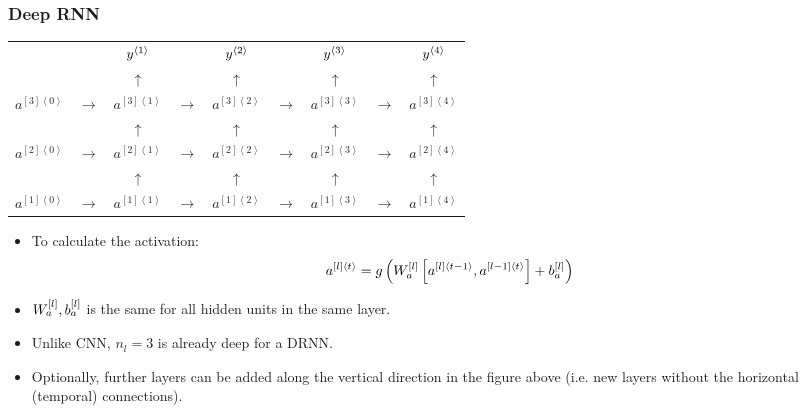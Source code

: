 \subsubsection{Deep RNN}
\newcommand{\drnnunit}[3]{#1^{\left[#2\right]\left\langle #3\right\rangle}}
\begin{center}
  \begin{tabular}{ccccccccc}
    && $y^{\left\langle 1\right\rangle}$ & & $y^{\left\langle 2\right\rangle}$ & & $y^{\left\langle 3\right\rangle}$ & & $y^{\left\langle 4\right\rangle}$\\
    && $\uparrow$ & &  $\uparrow$ & &  $\uparrow$ & &  $\uparrow$\\
    $\drnnunit{a}{3}{0}$ & $\rightarrow$ & $\boxed{\drnnunit{a}{3}{1}}$ & $\rightarrow$ & $\boxed{\drnnunit{a}{3}{2}}$ & $\rightarrow$ & $\boxed{\drnnunit{a}{3}{3}}$ & $\rightarrow$ & $\boxed{\drnnunit{a}{3}{4}}$ \\
    && $\uparrow$ & &  $\uparrow$ & &  $\uparrow$ & &  $\uparrow$\\
    $\drnnunit{a}{2}{0}$ & $\rightarrow$ & $\boxed{\drnnunit{a}{2}{1}}$ & $\rightarrow$ & $\boxed{\drnnunit{a}{2}{2}}$ & $\rightarrow$ & $\boxed{\drnnunit{a}{2}{3}}$ & $\rightarrow$ & $\boxed{\drnnunit{a}{2}{4}}$ \\
    && $\uparrow$ & &  $\uparrow$ & &  $\uparrow$ & &  $\uparrow$\\
    $\drnnunit{a}{1}{0}$ & $\rightarrow$ & $\boxed{\drnnunit{a}{1}{1}}$ & $\rightarrow$ & $\boxed{\drnnunit{a}{1}{2}}$ & $\rightarrow$ & $\boxed{\drnnunit{a}{1}{3}}$ & $\rightarrow$ & $\boxed{\drnnunit{a}{1}{4}}$ \\
  \end{tabular}
\end{center}
\begin{itemize}
  \item To calculate the activation:
  \begin{align*}
    \drnnunit{a}{l}{t}=g\left(\bracketss{W_a}{l}\left[\drnnunit{a}{l}{t-1},\drnnunit{a}{l-1}{t}\right]+\bracketss{b_a}{l}\right)
  \end{align*}
  \item $W_a^{\left[ l\right]},b_a^{\left[ l\right]}$ is the same for all hidden units in the same layer.
  \item Unlike CNN, $n_l=3$ is already deep for a DRNN.
  \item Optionally, further layers can be added along the vertical direction in the figure above (i.e. new layers without the horizontal (temporal) connections).
\end{itemize}
\ifx\PREAMBLE\undefined

\fi